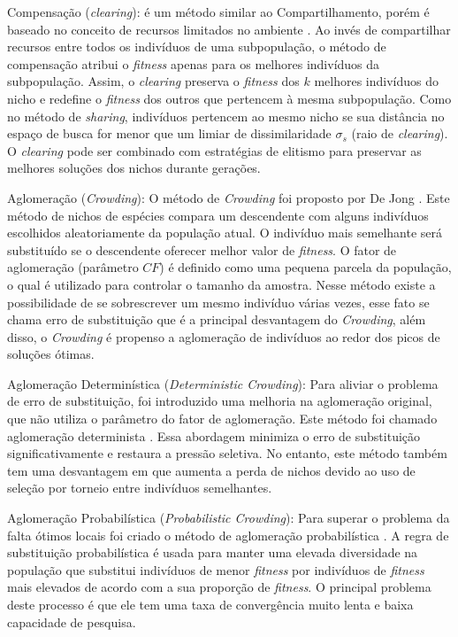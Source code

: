 Compensação (\textit{clearing}): é um método similar ao Compartilhamento, porém é baseado no conceito de recursos limitados no ambiente \cite{clearing}. Ao invés de compartilhar recursos entre todos os indivíduos de uma subpopulação, o método de compensação atribui o \textit{fitness} apenas para os melhores indivíduos da subpopulação. Assim, o \textit{clearing} preserva o \textit{fitness} dos $k$ melhores indivíduos do nicho e redefine o \textit{fitness} dos outros que pertencem à mesma subpopulação. Como no método de \textit{sharing}, indivíduos pertencem ao mesmo nicho se sua distância no espaço de busca for menor que um limiar de dissimilaridade $\sigma_s$ (raio de \textit{clearing}). O \textit{clearing} pode ser combinado com estratégias de elitismo para preservar as melhores soluções dos nichos durante gerações.

Aglomeração (\textit{Crowding}): O método de \textit{Crowding} foi proposto por De Jong \cite{crowding}. Este método de nichos de espécies compara um descendente com alguns indivíduos escolhidos aleatoriamente da população atual. O indivíduo mais semelhante será substituído se o descendente oferecer melhor valor de \textit{fitness}. O fator de aglomeração (parâmetro $CF$) é definido como uma pequena parcela da população, o qual é utilizado para controlar o tamanho da amostra. Nesse método existe a possibilidade de se sobrescrever um mesmo indivíduo várias vezes, esse fato se chama erro de substituição que é a principal desvantagem do \textit{Crowding}, além disso, o \textit{Crowding} é propenso a aglomeração de indivíduos ao redor dos picos de soluções ótimas.

Aglomeração Determinística (\textit{Deterministic Crowding}): Para aliviar o problema de erro de substituição, foi introduzido uma melhoria na aglomeração original, que não utiliza o parâmetro do fator de aglomeração. Este método foi chamado aglomeração determinista \cite{deterministic_crowding}. Essa abordagem minimiza o erro de substituição significativamente e restaura a pressão seletiva. No entanto, este método também tem uma desvantagem em que aumenta a perda de nichos devido ao uso de seleção por torneio entre indivíduos semelhantes.

Aglomeração Probabilística (\textit{Probabilistic Crowding}): Para superar o problema da falta ótimos locais foi criado o método de aglomeração probabilística \cite{probabilisti_crowding}. A regra de substituição probabilística é usada para manter uma elevada diversidade na população que substitui indivíduos de menor \textit{fitness} por indivíduos de \textit{fitness} mais elevados de acordo com a sua proporção de \textit{fitness}. O principal problema deste processo é que ele tem uma taxa de convergência muito lenta e baixa capacidade de pesquisa.

